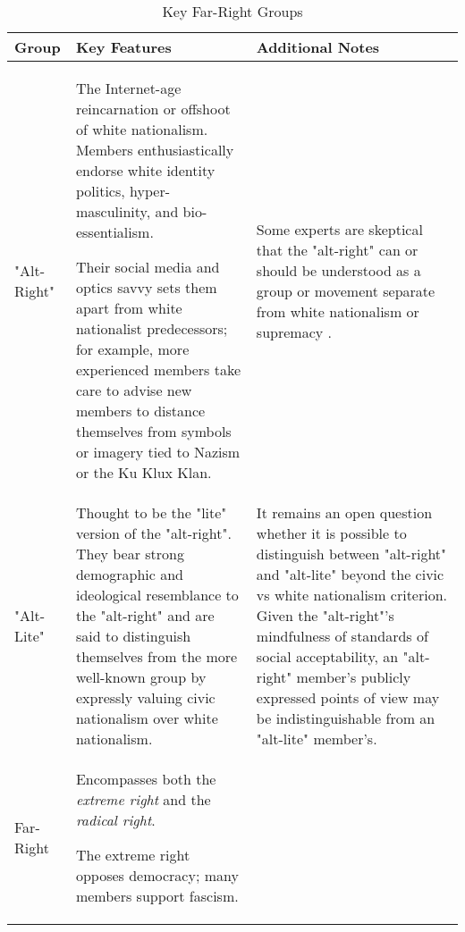 \documentclass[acmlarge, screen, authorversion]{acmart}
\begin{document}
\begin{table*}
\caption{Key Far-Right Groups}
\label{table:key-terms}
\begin{tabular}{ p{3cm}  p{7cm}  p{6cm} }

  \toprule
  Group & Key Features & Additional Notes \\
  \midrule
  "Alt-Right" & The Internet-age reincarnation or offshoot of white nationalism. Members enthusiastically endorse white identity politics, hyper-masculinity, and bio-essentialism.
  
  \medskip
  
  Their social media and optics savvy sets them apart from white nationalist predecessors; for example, more experienced members take care to advise new members to distance themselves from symbols or imagery tied to Nazism or the Ku Klux Klan.

   & Some experts are skeptical that the "alt-right" can or should be understood as a group or movement separate from white nationalism or supremacy \cite{hartzellAltWhiteConceptualizingAltRight, johndaniszewskiWritingAltright2016}. \\ 
  \hline
  "Alt-Lite" & Thought to be the "lite" version of the "alt-right". They bear strong demographic and ideological resemblance to the "alt-right" and are said to distinguish themselves from the more well-known group by expressly valuing civic nationalism over white nationalism. & It remains an open question whether it is possible to distinguish between "alt-right" and "alt-lite" beyond the civic vs white nationalism criterion. Given the "alt-right"'s mindfulness of standards of social acceptability, an "alt-right" member's publicly expressed points of view may be indistinguishable from an "alt-lite" member's. 
  \\
  \hline
  Far-Right & Encompasses both the \textit{extreme right} and the \textit{radical right}. 
  
  \medskip
  
  The extreme right opposes democracy; many members support fascism. 
  
  \medskip 
  

\end{tabular}
\end{table*}
\end{document}
